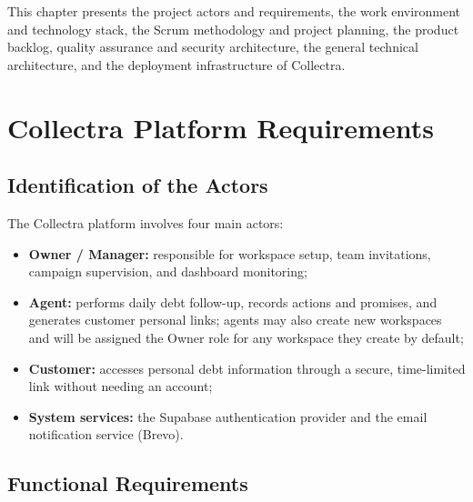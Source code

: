 \documentclass[12pt,a4paper]{report}
\begin{document}
This chapter presents the project actors and requirements, the work environment and
technology stack, the Scrum methodology and project planning, the product backlog,
quality assurance and security architecture, the general technical architecture,
and the deployment infrastructure of Collectra.

\section{Collectra Platform Requirements}

\subsection{Identification of the Actors}

The Collectra platform involves four main actors:
\begin{itemize}
  \item \textbf{Owner / Manager:} responsible for workspace setup, team invitations,
        campaign supervision, and dashboard monitoring;
  \item \textbf{Agent:} performs daily debt follow-up, records actions and promises,
      and generates customer personal links; agents may also create new workspaces and
      will be assigned the Owner role for any workspace they create by default;
  \item \textbf{Customer:} accesses personal debt information through a secure,
        time-limited link without needing an account;
  \item \textbf{System services:} the Supabase authentication provider and the
        email notification service (Brevo).
\end{itemize}

\subsection{Functional Requirements}
\end{document}
